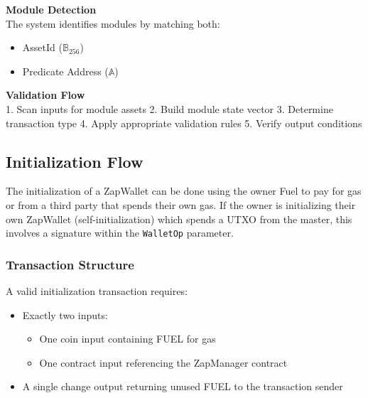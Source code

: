 \textbf{Module Detection}\\
The system identifies modules by matching both:
\begin{itemize}
    \item AssetId ($\mathbb{B}_{256}$)
    \item Predicate Address ($\mathbb{A}$)
\end{itemize}

\textbf{Validation Flow}\\
1. Scan inputs for module assets
2. Build module state vector
3. Determine transaction type
4. Apply appropriate validation rules
5. Verify output conditions




\subsection{Initialization Flow}
The initialization of a ZapWallet can be done using the owner Fuel  to pay for gas or from a third party that spends their own gas. If the owner is
initializing their own ZapWallet (self-initialization) which spends a  UTXO from the master, this involves a signature within the \texttt{WalletOp} parameter.

\subsubsection{Transaction Structure}
A valid initialization transaction requires:
\begin{itemize}
    \item Exactly two inputs:
        \begin{itemize}
            \item One coin input containing FUEL  for gas
            \item One contract input referencing the ZapManager contract
        \end{itemize}
    \item A single change output returning unused FUEL  to the transaction sender
\end{itemize}


